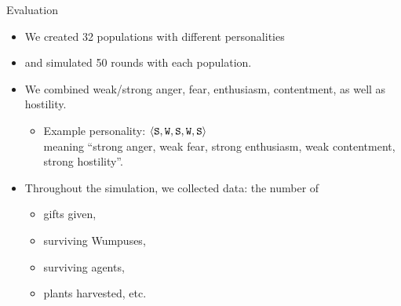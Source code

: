    \begin{frame}{Evaluation}
      \begin{itemize}
         \item We created 32 populations with different personalities
         \item and simulated 50 rounds with each population.
         \item We combined weak/strong anger, fear, enthusiasm, contentment, as well as hostility.
         \begin{itemize}
            \item Example personality: $\langle \mathtt{S},\mathtt{W}, \mathtt{S}, \mathtt{W}, \mathtt{S} \rangle$\\
            meaning ``strong anger, weak fear, strong enthusiasm, weak contentment, strong hostility''.
         \end{itemize}
         \item Throughout the simulation, we collected data: the number of
         \begin{itemize}
            \item gifts given,
            \item surviving Wumpuses,
            \item surviving agents,
            \item plants harvested, etc.
         \end{itemize}
      \end{itemize}
   \end{frame}
   
